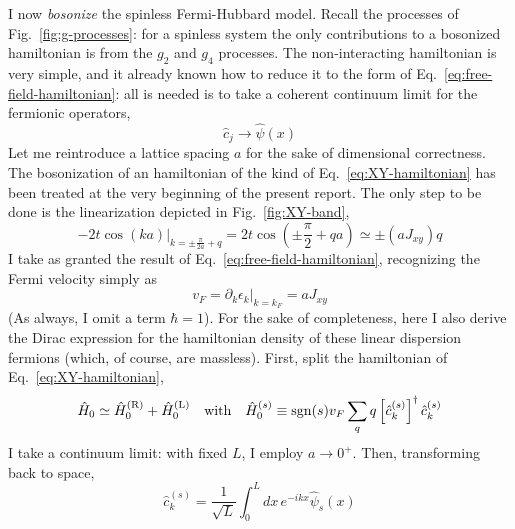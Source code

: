 I now \textit{bosonize} the spinless Fermi-Hubbard model. Recall the processes of Fig.~\ref{fig:g-processes}: for a spinless system the only contributions to a bosonized hamiltonian is from the $g_2$ and $g_4$ processes. The non-interacting hamiltonian is very simple, and it already known how to reduce it to the form of Eq.~\eqref{eq:free-field-hamiltonian}: all is needed is to take a coherent continuum limit for the fermionic operators,
\[
	\hat c_j \to \hat \psi(x)
\]
Let me reintroduce a lattice spacing $a$ for the sake of dimensional correctness. The bosonization of an hamiltonian of the kind of Eq.~\eqref{eq:XY-hamiltonian} has been treated at the very beginning of the present report. The only step to be done is the linearization depicted in Fig.~\ref{fig:XY-band},
\[
	-2t \cos (ka) \big|_{k = \pm \frac{\pi}{2a} + q} = 2t \cos \left(
		\pm \frac{\pi}{2} + qa
	\right) \simeq \pm (a J_{xy}) q
\]
I take as granted the result of Eq.~\eqref{eq:free-field-hamiltonian}, recognizing the Fermi velocity simply as
\[
	v_F = \partial_k \epsilon_k \big|_{k = k_F} = a J_{xy}
\]
(As always, I omit a term $\hbar=1$).
For the sake of completeness, here I also derive the Dirac expression for the hamiltonian density of these linear dispersion fermions (which, of course, are massless). First, split the hamiltonian of Eq.~\eqref{eq:XY-hamiltonian},
\[
	\hat H_0 \simeq \hat H_0^{(\mathrm{R})} + \hat H_0^{(\mathrm{L})}
	\quad\text{with}\quad
	\hat H_0^{(s)} \equiv \mathrm{sgn}(s) v_F \sum_q q \left[ \hat c_k^{(s)} \right]^\dagger \hat c_k^{(s)}
\]
I take a continuum limit: with fixed $L$, I employ $a \to 0^+$. Then, transforming back to space,
\[
	\hat c_k^{(s)} = \frac{1}{\sqrt{L}} \int_0^L dx \, e^{-ikx} \hat \psi_s(x) 
\]


